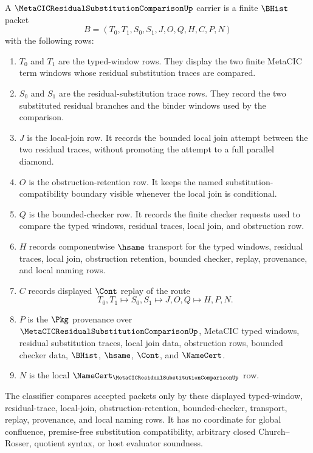 \begin{definition}
\label{def:metacic-residual-substitution-comparison-carrier}
A $\MetaCICResidualSubstitutionComparisonUp$ carrier is a finite $\BHist$ packet
$$
B=(T_0,T_1,S_0,S_1,J,O,Q,H,C,P,N)
$$
with the following rows:
\begin{enumerate}
\item $T_0$ and $T_1$ are the typed-window rows. They display the two finite MetaCIC term windows whose residual substitution traces are compared.
\item $S_0$ and $S_1$ are the residual-substitution trace rows. They record the two substituted residual branches and the binder windows used by the comparison.
\item $J$ is the local-join row. It records the bounded local join attempt between the two residual traces, without promoting the attempt to a full parallel diamond.
\item $O$ is the obstruction-retention row. It keeps the named substitution-compatibility boundary visible whenever the local join is conditional.
\item $Q$ is the bounded-checker row. It records the finite checker requests used to compare the typed windows, residual traces, local join, and obstruction row.
\item $H$ records componentwise $\hsame$ transport for the typed windows, residual traces, local join, obstruction retention, bounded checker, replay, provenance, and local naming rows.
\item $C$ records displayed $\Cont$ replay of the route
$$
T_0,T_1 \longmapsto S_0,S_1 \longmapsto J,O,Q \longmapsto H,P,N .
$$
\item $P$ is the $\Pkg$ provenance over $\MetaCICResidualSubstitutionComparisonUp$, MetaCIC typed windows, residual substitution traces, local join data, obstruction rows, bounded checker data, $\BHist$, $\hsame$, $\Cont$, and $\NameCert$.
\item $N$ is the local $\NameCert_{\MetaCICResidualSubstitutionComparisonUp}$ row.
\end{enumerate}
The classifier compares accepted packets only by these displayed typed-window, residual-trace, local-join, obstruction-retention, bounded-checker, transport, replay, provenance, and local naming rows. It has no coordinate for global confluence, premise-free substitution compatibility, arbitrary closed Church--Rosser, quotient syntax, or host evaluator soundness.
\end{definition}


